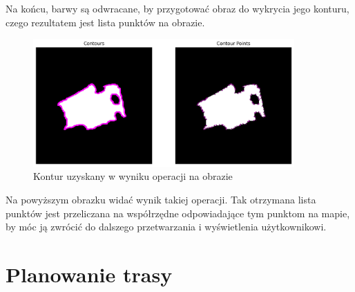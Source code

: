 Na końcu, barwy są odwracane, by przygotować obraz do wykrycia jego konturu, czego rezultatem jest lista punktów na obrazie. 

\begin{figure}[H]
    \centering
    \includegraphics[width=10cm]{images/Contour.jpg}
    \caption{Kontur uzyskany w wyniku operacji na obrazie}
\end{figure}

Na powyższym obrazku widać wynik takiej operacji. Tak otrzymana lista punktów jest przeliczana na współrzędne odpowiadające tym punktom na mapie, by móc ją zwrócić do dalszego przetwarzania i wyświetlenia użytkownikowi.

\section{Planowanie trasy}